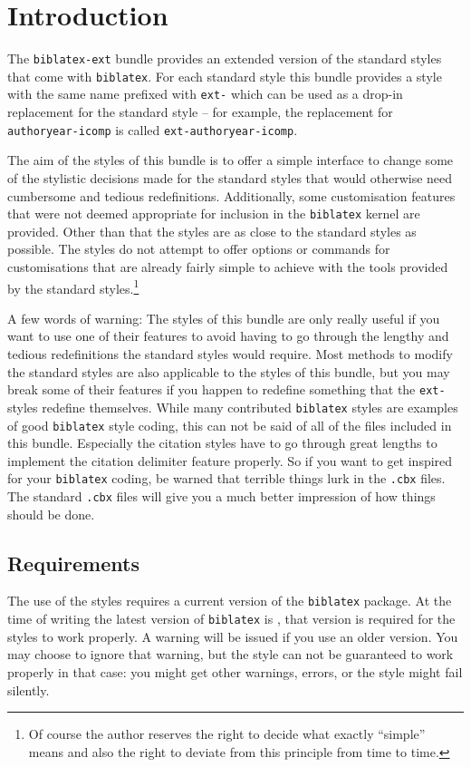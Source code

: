 \documentclass[DIV=9]{scrartcl}
\makeatletter
\providecommand*{\printtitlepage}{}
\newcommand*{\biblatexversion}{\extblx@requiredbiblatexversion}
\def\sty{\texttt}
\makeatother
\begin{document}
\printtitlepage
\tableofcontents


\section{Introduction}\label{sec:int}
The \sty{biblatex-ext} bundle provides an extended version of the standard
styles that come with \sty{biblatex}.
For each standard style this bundle provides a style with the same name
prefixed with \texttt{ext-} which can be used as a drop-in replacement for the
standard style -- for example, the replacement for \texttt{authoryear-icomp}
is called \texttt{ext-authoryear-icomp}.

The aim of the styles of this bundle is to offer a simple interface to change
some of the stylistic decisions made for the standard styles that would
otherwise need cumbersome and tedious redefinitions.
Additionally, some customisation features that were not deemed appropriate
for inclusion in the \sty{biblatex} kernel are provided.
Other than that the styles are as close to the standard styles as possible.
The styles do not attempt to offer options or commands for customisations that
are already fairly simple to achieve with the tools provided by the standard
styles.\footnote{Of course the author reserves the right to decide what
exactly \enquote{simple} means and also the right to deviate from this principle
from time to time.}

A few words of warning:
The styles of this bundle are only really useful if you want to use one of their
features to avoid having to go through the lengthy and tedious redefinitions the
standard styles would require.
Most methods to modify the standard styles are also applicable to the styles of
this bundle, but you may break some of their features if you happen to redefine
something that the \sty{ext-} styles redefine themselves.
While many contributed \sty{biblatex} styles are examples of good \sty{biblatex}
style coding, this can not be said of all of the files included in this bundle.
Especially the citation styles have to go through great lengths to implement the
citation delimiter feature properly.
So if you want to get inspired for your \sty{biblatex} coding, be warned that
terrible things lurk in the \sty{.cbx} files.
The standard \sty{.cbx} files will give you a much better impression of how
things should be done.


\subsection{Requirements}
The use of the styles requires a current version of the \sty{biblatex} package.
At the time of writing the latest version of \sty{biblatex} is \biblatexversion,
that version is required for the styles to work properly.
A warning will be issued if you use an older version.
You may choose to ignore that warning, but the style can not be guaranteed to
work properly in that case:
you might get other warnings, errors, or the style might fail silently.
\end{document}
